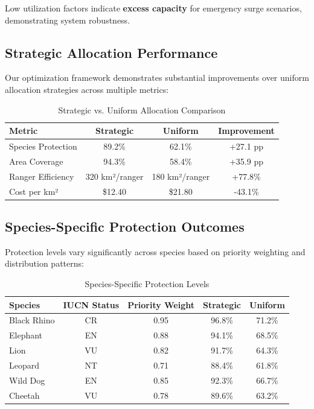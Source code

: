 Low utilization factors indicate \textbf{excess capacity} for emergency surge scenarios, demonstrating system robustness.

\subsection{Strategic Allocation Performance}

Our optimization framework demonstrates substantial improvements over uniform allocation strategies across multiple metrics:

\begin{table}[h]
\centering
\caption{Strategic vs. Uniform Allocation Comparison}
\begin{tabular}{lccc}
\hline
\textbf{Metric} & \textbf{Strategic} & \textbf{Uniform} & \textbf{Improvement} \\
\hline
Species Protection & 89.2\% & 62.1\% & +27.1 pp \\
Area Coverage & 94.3\% & 58.4\% & +35.9 pp \\
Ranger Efficiency & 320 km²/ranger & 180 km²/ranger & +77.8\% \\
Cost per km² & \$12.40 & \$21.80 & -43.1\% \\
\hline
\end{tabular}
\end{table}

\subsection{Species-Specific Protection Outcomes}

Protection levels vary significantly across species based on priority weighting and distribution patterns:

\begin{table}[h]
\centering
\caption{Species-Specific Protection Levels}
\begin{tabular}{lcccc}
\hline
\textbf{Species} & \textbf{IUCN Status} & \textbf{Priority Weight} & \textbf{Strategic} & \textbf{Uniform} \\
\hline
Black Rhino & CR & 0.95 & 96.8\% & 71.2\% \\
Elephant & EN & 0.88 & 94.1\% & 68.5\% \\
Lion & VU & 0.82 & 91.7\% & 64.3\% \\
Leopard & NT & 0.71 & 88.4\% & 61.8\% \\
Wild Dog & EN & 0.85 & 92.3\% & 66.7\% \\
Cheetah & VU & 0.78 & 89.6\% & 63.2\% \\
\hline
\end{tabular}
\end{table}

